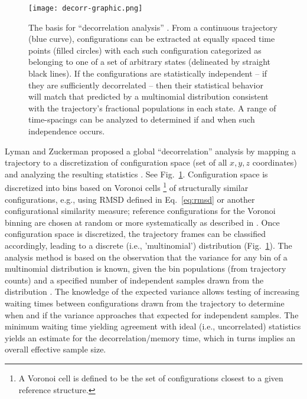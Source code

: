 \begin{figure}
  \centering
  \texttt{[image: decorr-graphic.png]}
  \caption{The basis for ``decorrelation analysis'' \cite{Lyman2007a}.
  From a continuous trajectory (blue curve), configurations can be extracted at equally spaced time points (filled circles) with each such configuration categorized as belonging to one of a set of arbitrary states (delineated by straight black lines).  
  If the configurations are statistically independent -- if they are sufficiently decorrelated -- then their statistical behavior will match that predicted by a multinomial distribution consistent with the trajectory's fractional populations in each state.
  A range of time-spacings can be analyzed to determined if and when such independence occurs.}
  \label{fig:decorr}
\end{figure}

Lyman and Zuckerman proposed a global ``decorrelation'' analysis by mapping a trajectory to a discretization of configuration space (set of all $x, y, z$ coordinates) and analyzing the resulting statistics \cite{Lyman2007a}.
See Fig.\ \ref{fig:decorr}.
Configuration space is discretized into bins based on Voronoi cells \footnote{A Voronoi cell is defined to be the set of configurations closest to a given reference structure.} of structurally similar configurations,  e.g., using RMSD defined in Eq.\ \ref{eq:rmsd} or another configurational similarity measure; reference configurations for the Voronoi binning are chosen at random or more systematically as described in \cite{Lyman2007a}.
Once configuration space is discretized, the trajectory frames can be classified accordingly, leading to a discrete (i.e., 'multinomial') distribution (Fig.\ \ref{fig:decorr}).
The analysis method is based on the observation that the variance for any bin of a multinomial distribution is known, given the bin populations (from trajectory counts) and a specified number of independent samples drawn from the distribution \cite{Lyman2007a}.
The knowledge of the expected variance allows testing of increasing waiting times between configurations drawn from the trajectory to determine when and if the variance approaches that expected for independent samples.
The minimum waiting time yielding agreement with ideal (i.e., uncorrelated) statistics yields an estimate for the decorrelation/memory time, which in turns implies an overall effective sample size. 



